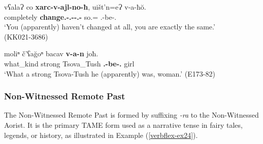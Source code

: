 \begin{exe}
	\ex\label{verbflex-ex23}
	\begin{xlist}
		
		
			\ex\label{verbflex-ex23a}
			\gll vʕalaɁ co \textbf{xarc-v-ajl-no-ħ}, uišt'n=eɁ v-a-ħ\u{o}. \\
			completely {\Neg} \textbf{change.{\Pfv}-{\M}.{\Sg}-{\Intr}-{\Nw}.{\Aor}-{\Ssg}} so.{\Dist}={\Emph} {\M}.{\Sg}-be-{\Ssg}.{\Nom} \\
			\trans `You (apparently) haven't changed at all, you are exactly the same.' \\
			\hfill (KK021-3686)
		
		
		
			\ex\label{verbflex-ex23b}
			\gll moliⁿ č'ʕa\u{g}oⁿ bacav \textbf{v-a-n} joħ. \\
			what\_kind strong Tsova\_Tush \textbf{{\M}.{\Sg}-be-{\Nw}.{\Aor}} girl \\
			\trans `What a strong Tsova-Tush he (apparently) was, woman.'
			\hfill (E173-82)
		
		
		
		
	\end{xlist}
\end{exe}



\subsubsection{Non-Witnessed Remote Past} \label{nw.rem}

The Non-Witnessed Remote Past is formed by suffixing \textit{-ra} to the Non-Witnessed Aorist. It is the primary TAME form used as a narrative tense in fairy tales, legends, or history, as illustrated in Example (\ref{verbflex-ex24}).

